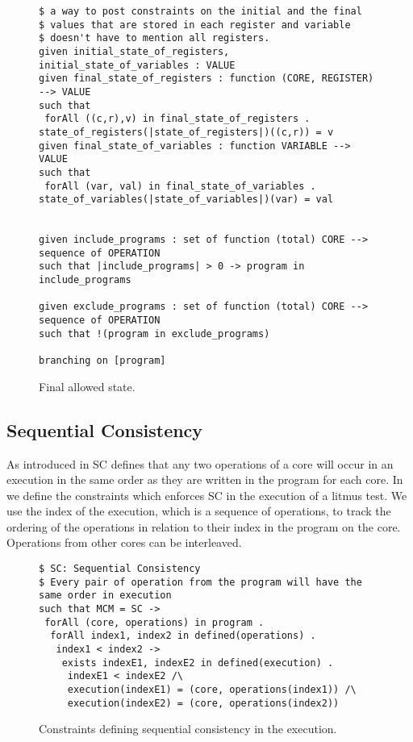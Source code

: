 \documentclass[runningheads]{llncs}
\begin{document}
\begin{figure}[t]
\begin{lstlisting}
$ a way to post constraints on the initial and the final
$ values that are stored in each register and variable
$ doesn't have to mention all registers.
given initial_state_of_registers, initial_state_of_variables : VALUE
given final_state_of_registers : function (CORE, REGISTER) --> VALUE
such that
 forAll ((c,r),v) in final_state_of_registers . state_of_registers(|state_of_registers|)((c,r)) = v
given final_state_of_variables : function VARIABLE --> VALUE
such that
 forAll (var, val) in final_state_of_variables . state_of_variables(|state_of_variables|)(var) = val


given include_programs : set of function (total) CORE --> sequence of OPERATION
such that |include_programs| > 0 -> program in include_programs

given exclude_programs : set of function (total) CORE --> sequence of OPERATION
such that !(program in exclude_programs)

branching on [program]
\end{lstlisting}
\caption{Final allowed state.\label{fig:essence6}}
\end{figure}




\subsection{Sequential Consistency}
As introduced in  SC defines that any two operations of a core will occur in an execution in the same order as they are written in the program for each core.
In  we define the constraints which enforces SC in the execution of a litmus test.
We use the index of the execution, which is a sequence of operations, to track the ordering of the operations in relation to their index in the program on the core.
Operations from other cores can be interleaved.

\begin{figure}
\begin{lstlisting}
$ SC: Sequential Consistency
$ Every pair of operation from the program will have the same order in execution
such that MCM = SC ->
 forAll (core, operations) in program .
  forAll index1, index2 in defined(operations) .
   index1 < index2 ->
    exists indexE1, indexE2 in defined(execution) .
     indexE1 < indexE2 /\
     execution(indexE1) = (core, operations(index1)) /\
     execution(indexE2) = (core, operations(index2))
\end{lstlisting}
\caption{Constraints defining sequential consistency in the execution. \label{fig:essenceSC}}
\end{figure}
\end{document}
